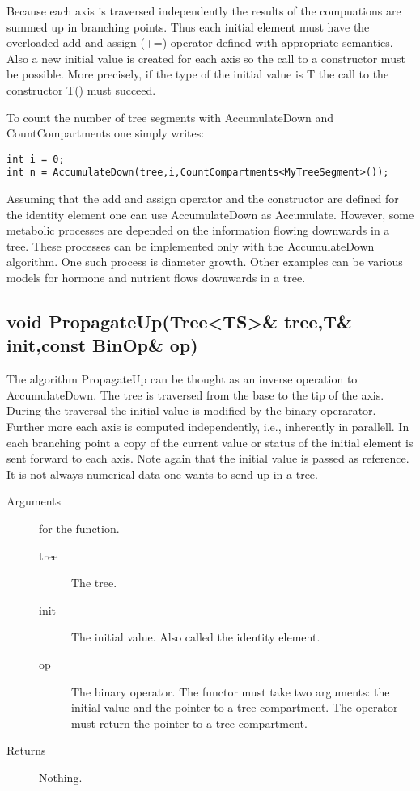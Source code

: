 Because  each axis is   traversed   independently the results of   the
compuations  are  summed up in  branching   points.  Thus each initial
element must have the overloaded add and  assign (+=) operator defined
with  appropriate semantics. Also a  new initial  value is created for
each  axis  so  the call to   a  constructor  must  be  possible. More
precisely, if  the type of   the initial value  is  T the call to  the
constructor T() must succeed.

To  count  the   number of   tree  segments  with  AccumulateDown  and
CountCompartments one simply writes:

\begin{verbatim}
int i = 0;
int n = AccumulateDown(tree,i,CountCompartments<MyTreeSegment>());
\end{verbatim}

Assuming that  the  add and assign  operator and   the constructor are
defined   for  the  identity element  one  can   use AccumulateDown as
Accumulate.  However,  some  metabolic processes  are  depended on the
information  flowing downwards in  a   tree.  These  processes  can be
implemented only with  the AccumulateDown algorithm.  One such process
is diameter growth.  Other examples  can be various models for hormone
and nutrient flows downwards in a tree.

\subsection{void PropagateUp(Tree<TS>\& tree,T\& init,const BinOp\& op)}

The algorithm PropagateUp  can be thought as  an inverse  operation to
AccumulateDown. The tree is traversed from the  base to the tip of the
axis. During the traversal the initial value is modified by the binary
operarator. Further  more each axis  is computed  independently, i.e.,
inherently in parallell. In each branching point a copy of the current
value or status of the  initial element is  sent forward to each axis.
Note again  that the initial value  is passed as  reference. It is not
always numerical data one wants to send up in a tree.

\begin{description}
   \item [Arguments] for the function.
     \begin{description}
        \item [tree] The tree.
        \item [init] The initial value. Also called the identity
     element.
        \item [op] The binary operator. The functor must take two
     arguments: the initial value and the pointer to a tree compartment. The
     operator must return the pointer to a tree compartment.
     \end{description} 
   \item[Returns] Nothing.
\end{description} 
 
